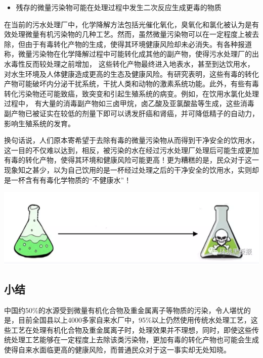 \documentclass[
]{book}
\providecommand{\tightlist}{%
  \setlength{\itemsep}{0pt}\setlength{\parskip}{0pt}}
\begin{document}
\begin{itemize}
\tightlist
\item
  残存的微量污染物可能在处理过程中发生二次反应生成更毒的物质
\end{itemize}

在当前的污水处理厂中，化学降解方法包括光催化氧化，臭氧化和氯化被认为是有效处理微量有机污染物的几种工艺。然而，虽然微量污染物可以在一定程度上被去除，但由于有毒转化产物的生成，使得其环境健康风险却未必消失。有各种报道称，微量污染物在化学降解过程中可能转化成其他的副产物，使得污水处理厂的出水毒性反而较处理之前增加， 这些转化产物最终进入地表水，甚至到达饮用水，对水生环境及人体健康造成更高的生态及健康风险。有研究表明，这些有毒的转化产物可能破坏内分泌干扰系统，干扰人类和动物的激素系统功能。此外，有些有毒转化污染物还可能致癌，致突变和引起生殖系统的病变。例如，在饮用水氯化处理过程中， 有大量的消毒副产物如三卤甲烷，卤乙酸及亚氯酸盐等生成，这些消毒副产物已被证实在较低的剂量下即可以诱发肝癌和肾癌，并可降低精子的自动力，影响生殖系统的发育。

换句话说，人们原本寄希望于去除有毒的微量污染物从而得到干净安全的饮用水，这一目的不仅难以达到，相反，被污染的水在经过污水处理厂处理后可能生成更加有毒的转化产物，使得其环境和健康风险可能更高！更为糟糕的是，民众对于这一现象知之甚少，以为自己饮用的是一杯经过处理之后的干净安全的饮用水，实则却是一杯含有有毒化学物质的``不健康水''！

\includegraphics[width=8.33in]{images/dushui4}

\hypertarget{ux5c0fux7ed3}{%
\subsection{小结}\label{ux5c0fux7ed3}}

中国约50\%的水源受到微量有机化合物及重金属离子等物质的污染，令人堪忧的是，目前全国县以上4000多家自来水厂中，95\%以上仍然使用传统水处理工艺，这些工艺在处理有机化合物及重金属离子时，处理效果并不理想，同时，即使这些传统处理工艺能够在一定程度上去除该类污染物，更加有毒的转化产物也可能会生成使得自来水面临更高的健康风险，而普通民众对于这一事实却无处知晓。
\end{document}
